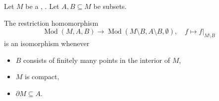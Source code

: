 \begin{theorem} \label{theorem:restriction_homomorphism_by_taking_out_finitely_many_points_for_mapping_class_group_of_an_oriented_topological_manifold_is_isomorphism_under_nice_conditions}
    Let $M$ be a ,  . Let $A,B \subseteq M$ be subsets.

    The restriction homomorphism
    $$\operatorname{Mod}(M,A,B) \to \operatorname{Mod}(M \setminus B, A \setminus B, \emptyset), \quad f \mapsto f|_{M \setminus B}$$
    is an isomorphism whenever 
    \begin{itemize}
        \item $B$ consists of finitely many points in the interior of $M$,
        \item $M$ is compact,
        \item $\partial M \subseteq A$. 
    \end{itemize}
\end{theorem}